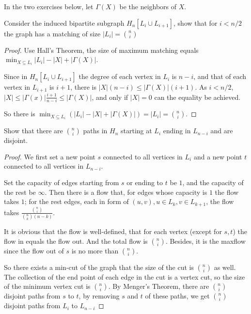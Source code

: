


    \maketitle

    In the two exercises below, let $\Gamma(X)$ be the neighbors of $X$. 
    \begin{thm}{}{}
        Consider the induced bipartite subgraph $H_n[L_i\cup L_{i+1}]$, show that for $i<n/2$ the graph has a matching of size $|L_i|=\binom{n}{i}$
    \end{thm}
    \begin{proof}
        Use Hall's Theorem, the size of maximum matching equals $\min_{X\subseteq L_i}|L_i|-|X|+|\Gamma(X)|$. 

        Since in $H_n[L_i\cup L_{i+1}]$ the degree of each vertex in $L_i$ is $n-i$, 
        and that of each vertex in $L_{i+1}$ is $i+1$, there is $|X|(n-i)\leq|\Gamma(X)|(i+1)$. 
        As $i<n/2$, $|X|\leq|\Gamma(x)|\frac{i+1}{n-i}\leq|\Gamma(X)|$, and only if $|X|=0$ can the equality be achieved. 

        So there is $\min_{X\subseteq L_i}(|L_i|-|X|+|\Gamma(X)|)=|L_i|=\binom{n}{i}$. 
    \end{proof} 

    \begin{thm}{}{}
        Show that there are $\binom{n}{i}$ paths in $H_n$ starting at $L_i$ ending in $L_{n-i}$ and are disjoint. 
    \end{thm}
    \begin{proof}
        We first set a new point $s$ connected to all vertices in $L_i$ and a new point $t$ connected to all vertices in $L_{n-i}$. 
        
        Set the capacity of edges starting from $s$ or ending to $t$ be $1$, and the capacity of the rest be $\infty$. 
        Then there is a flow that, for edges whose capacity is $1$ the flow takes $1$; for the rest edges, 
        each in form of $(u,v), u\in L_k,v\in L_{k+1}$, the flow takes $\frac{\binom{n}{i}}{\binom{n}{k}(n-k)}$. 

        It is obvious that the flow is well-defined, that for each vertex (except for $s,t$) the flow in equals the flow out. 
        And the total flow is $\binom{n}{i}$. Besides, it is the maxflow since the flow out of $s$ is no more than $\binom{n}{i}$. 

        So there exists a min-cut of the graph that the size of the cut is $\binom{n}{i}$ as well. 
        The collection of the end point of each edge in the cut is a vertex cut, 
        so the size of the minimum vertex cut is $\binom{n}{i}$. 
        By Menger's Theorem, there are $\binom{n}{i}$ disjoint paths from $s$ to $t$, 
        by removing $s$ and $t$ of these paths, we get $\binom{n}{i}$ disjoint paths from $L_i$ to $L_{n-i}$ 
        
    \end{proof} 



